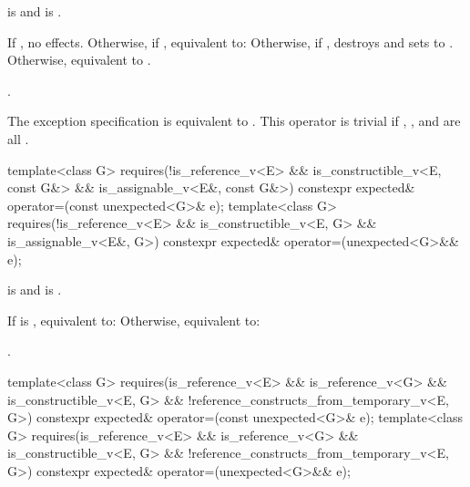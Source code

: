 \begin{itemdescr}
\pnum
\constraints
{} is  and  is .

\pnum
\effects
If , no effects. Otherwise, if , equivalent to:  Otherwise, if , destroys  and sets  to . Otherwise, equivalent to .

\pnum
\returns
{}.

\pnum
\remarks
The exception specification is equivalent to . This operator is trivial if , , and  are all .
\end{itemdescr}

%
\begin{itemdecl}
template<class G>
  requires(!is_reference_v<E> && is_constructible_v<E, const G&> &&
           is_assignable_v<E&, const G&>)
constexpr expected& operator=(const unexpected<G>& e);
template<class G>
  requires(!is_reference_v<E> && is_constructible_v<E, G> && is_assignable_v<E&, G>)
constexpr expected& operator=(unexpected<G>&& e);
\end{itemdecl}

\begin{itemdescr}
\pnum
\constraints
{} is  and  is .

\pnum
\effects
If  is , equivalent to:  Otherwise, equivalent to: 

\pnum
\returns
{}.
\end{itemdescr}

%
\begin{itemdecl}
template<class G>
  requires(is_reference_v<E> && is_reference_v<G> && is_constructible_v<E, G> &&
           !reference_constructs_from_temporary_v<E, G>)
constexpr expected& operator=(const unexpected<G>& e);
template<class G>
  requires(is_reference_v<E> && is_reference_v<G> && is_constructible_v<E, G> &&
           !reference_constructs_from_temporary_v<E, G>)
constexpr expected& operator=(unexpected<G>&& e);
\end{itemdecl}

